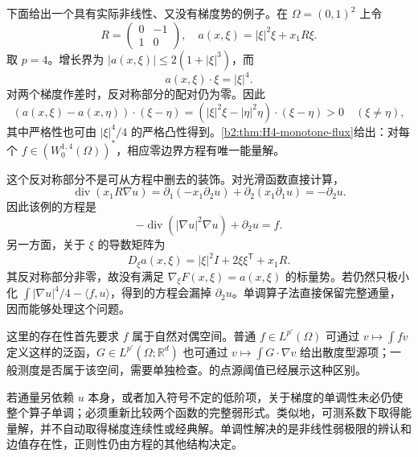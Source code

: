 下面给出一个具有实际非线性、又没有梯度势的例子。在 \(\Omega=(0,1)^2\) 上令
\[
 R=\begin{pmatrix}0&-1\\1&0\end{pmatrix},
 \quad a(x,\xi)=|\xi|^2\xi+x_1R\xi.
\]
取 \(p=4\)。增长界为 \(|a(x,\xi)|\le2(1+|\xi|^3)\)，而
\[
 a(x,\xi)\cdot\xi=|\xi|^4.
\]
对两个梯度作差时，反对称部分的配对仍为零。因此
\[
 (a(x,\xi)-a(x,\eta))\cdot(\xi-\eta)
  =(|\xi|^2\xi-|\eta|^2\eta)\cdot(\xi-\eta)>0
 \quad(\xi\ne\eta),
\]
其中严格性也可由 \(|\xi|^4/4\) 的严格凸性得到。\cref{b2:thm:H4-monotone-flux}给出：对每个 \(f\in(W_0^{1,4}(\Omega))^*\)，相应零边界方程有唯一能量解。

\ProseParagraphBreak

这个反对称部分不是可从方程中删去的装饰。对光滑函数直接计算，
\[
 \operatorname{div}(x_1R\nabla u)
   =\partial_1(-x_1\partial_2u)+\partial_2(x_1\partial_1u)
   =-\partial_2u.
\]
因此该例的方程是
\[
 -\operatorname{div}(|\nabla u|^2\nabla u)+\partial_2u=f.
\]
另一方面，关于 \(\xi\) 的导数矩阵为
\[
 D_\xi a(x,\xi)=|\xi|^2I+2\xi\xi^{\mathsf T}+x_1R.
\]
其反对称部分非零，故没有满足 \(\nabla_\xi F(x,\xi)=a(x,\xi)\) 的标量势。若仍然只极小化 \(\int|\nabla u|^4/4-\langle f,u\rangle\)，得到的方程会漏掉 \(\partial_2u\)。单调算子法直接保留完整通量，因而能够处理这个问题。

\ProseParagraphBreak

这里的存在性首先要求 \(f\) 属于自然对偶空间。普通 \(f\in L^{p'}(\Omega)\) 可通过 \(v\mapsto\int fv\) 定义这样的泛函，\(G\in L^{p'}(\Omega;\mathbb R^d)\) 也可通过 \(v\mapsto\int G\cdot\nabla v\) 给出散度型源项；一般测度是否属于该空间，需要单独检查。的点源阈值已经展示这种区别。

\ProseParagraphBreak

若通量另依赖 \(u\) 本身，或者加入符号不定的低阶项，关于梯度的单调性未必仍使整个算子单调；必须重新比较两个函数的完整弱形式。类似地，可测系数下取得能量解，并不自动取得梯度连续性或经典解。单调性解决的是非线性弱极限的辨认和边值存在性，正则性仍由方程的其他结构决定。
